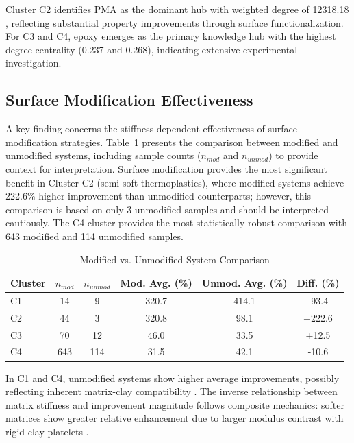 \documentclass[conference]{IEEEtran}
\begin{document}
Cluster C2 identifies PMA as the dominant hub with weighted degree of 12318.18 \cite{1}, reflecting substantial property improvements through surface functionalization. For C3 and C4, epoxy emerges as the primary knowledge hub \cite{92, 47, 49} with the highest degree centrality (0.237 and 0.268), indicating extensive experimental investigation.

\subsection{Surface Modification Effectiveness}

A key finding concerns the stiffness-dependent effectiveness of surface modification strategies. Table~\ref{tab:modification} presents the comparison between modified and unmodified systems, including sample counts ($n_{mod}$ and $n_{unmod}$) to provide context for interpretation. Surface modification provides the most significant benefit in Cluster C2 (semi-soft thermoplastics), where modified systems achieve 222.6\% higher improvement than unmodified counterparts; however, this comparison is based on only 3 unmodified samples and should be interpreted cautiously. The C4 cluster provides the most statistically robust comparison with 643 modified and 114 unmodified samples.

\begin{table}[htbp]
\caption{Modified vs. Unmodified System Comparison}
\begin{center}
\begin{tabular}{@{}lccccc@{}}
\toprule
Cluster & $n_{mod}$ & $n_{unmod}$ & Mod. Avg. (\%) & Unmod. Avg. (\%) & Diff. (\%) \\
\midrule
C1 & 14 & 9 & 320.7 & 414.1 & -93.4 \\
C2 & 44 & 3 & 320.8 & 98.1 & +222.6 \\
C3 & 70 & 12 & 46.0 & 33.5 & +12.5 \\
C4 & 643 & 114 & 31.5 & 42.1 & -10.6 \\
\bottomrule
\end{tabular}
\label{tab:modification}
\end{center}
\end{table}

In C1 and C4, unmodified systems show higher average improvements, possibly reflecting inherent matrix-clay compatibility \cite{65, 19}. The inverse relationship between matrix stiffness and improvement magnitude follows composite mechanics: softer matrices show greater relative enhancement due to larger modulus contrast with rigid clay platelets \cite{11, 14, 22}.
\end{document}
